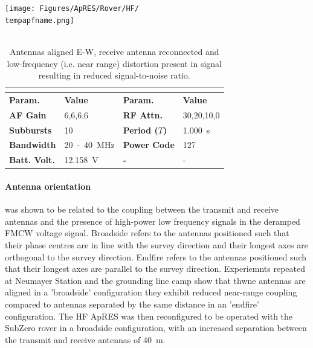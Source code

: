 \documentclass[a4paper,12pt]{article}
\newcommand{\apresdoc}[9]{
    \def\tempapfname{#1}
    \def\tempaploc{#2}
    \def\tempapcom{#3}
    \def\temptimestamp{#4}
    \def\tempafgain{#5}
    \def\temprfattn{#6}
    \def\tempperiod{#7}
    \def\tempflow{#8}
    \def\tempfupp{#9}
    \apresdoccont
}
\newcommand{\apresdoccont}[6]{
  \def\tempnatt{#1}
  \def\tempnchirp{#2}
  \def\tempnsubburst{#3}
  \def\temppowercode{#4}
  \def\tempbattvolt{#5}
  \def\tempaplbl{#6}

  \begin{table}
    \caption{\tempapcom}
    \rowcolors{2}{gray!25}{white}
    \centering
    \texttt{[image: Figures/ApRES/Rover/HF/\\tempapfname.png]}
    \\
    ~\\
    \begin{tabular}{>{\bfseries}l l >{\bfseries}l l}
      \hline
      \rowcolor{gray!50}
      \multicolumn{4}{c}{\textbf{Filename} \tempapfname} \\
      \hline
      Param. & \bfseries Value & Param. & \bfseries Value \\
      AF Gain & \tempafgain &
      RF Attn. & \temprfattn \\
      Subbursts & \tempnsubburst &
      Period ($T$) & \tempperiod~s \\
      Bandwidth & \tempflow~-~\tempfupp~MHz &
      Power Code & \temppowercode \\
      Batt. Volt. & \tempbattvolt~V &
      - & - \\
      \hline
    \end{tabular}
    \label{\tempaplbl}
  \end{table}
}
\begin{document}
\apresdoc
{2021-12-28\_214326.dat}
{Neumayer III}
{Antennas aligned E-W, receive antenna reconnected and low-frequency (i.e. near
range) distortion present in signal resulting in reduced signal-to-noise ratio.}
{2021-12-28 21:43:26.000}
{6,6,6,6}
{30,20,10,0}
{1.000}
{20}
{40}
{4}
{40}
{10}
{127}
{12.158}
{FigureHFApRESReconnectedAntenna}

\paragraph*{Antenna orientation} was shown to be related to the coupling between
the transmit and receive antennas and the presence of high-power low frequency
signals in the deramped FMCW voltage signal.  Broadside refers to the antennas
positioned such that their phase centres are in line with the survey direction
and their longest axes are orthogonal to the survey direction.  Endfire refers
to the antennas positioned such that their longest axes are parallel to the
survey direction.  Experiemnts repeated at Neumayer Station and the grounding
line camp show that thwne antennas are aligned in a 'broadside' configuration
they exhibit reduced near-range coupling compared to antennas separated by the
same distance in an 'endfire' configuration.  The HF ApRES was then reconfigured to be operated with the SubZero rover in a
broadside configuration, with an increased separation between the
transmit and receive antennas of \SI{40}{\metre}.
\end{document}
